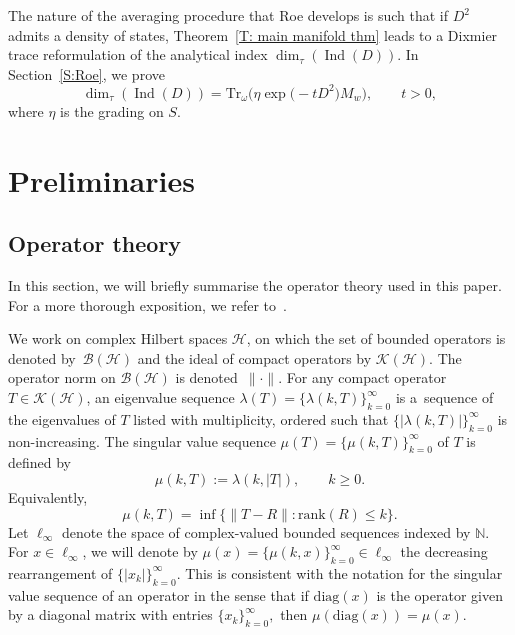\documentclass[pdftex]{sigma}
\numberwithin{equation}{section}
\begin{document}
The nature of the averaging procedure that Roe develops is such that if $D^2$ admits a density of states, Theorem~\ref{T: main manifold thm} leads to a Dixmier trace reformulation of the analytical index $\dim_\tau(\operatorname{Ind}(D))$. In Section~\ref{S:Roe}, we prove
\[
\dim_\tau(\operatorname{Ind}(D)) = \mathrm{Tr}_\omega\big(\eta \exp\bigl(-tD^2\bigr)M_w\big), \qquad t>0,
\]
where $\eta$ is the grading on $S$.

\section{Preliminaries}\label{S: Prelims}

\subsection{Operator theory}
In this section, we will briefly summarise the operator theory used in this paper. For a more thorough exposition, we refer to~\cite{LSZVol1, LMSZVol2}.

We work on complex Hilbert spaces $\mathcal{H}$, on which the set of bounded operators is denoted by~$\mathcal{B}(\mathcal{H})$ and the ideal of compact operators by $\mathcal{K}(\mathcal{H}).$ The operator norm on $\mathcal{B}(\mathcal{H})$ is denoted~$\|\cdot\|.$ For any compact operator $T \in \mathcal{K}(\mathcal{H})$, an eigenvalue sequence $\lambda(T) = \{\lambda(k,T)\}_{k=0}^\infty$ is a~sequence of the eigenvalues of $T$ listed with multiplicity, ordered such that $ \{|\lambda(k,T)|\}_{k=0}^\infty$ is non-increasing. The singular value sequence $\mu(T) = \{\mu(k,T)\}_{k=0}^\infty$ of $T$ is defined by
\[
\mu(k,T) :=\lambda(k,|T|), \qquad k \geq 0.
\]
Equivalently,
\[
\mu(k,T) = \inf\{\|T-R\|\colon \mathrm{rank}(R)\leq k\}.
\]
Let $\ell_\infty$ denote the space of complex-valued bounded sequences indexed by $\mathbb{N}.$ For $x\in \ell_\infty$, we will denote by $\mu(x) = \{\mu(k,x)\}_{k=0}^\infty \in \ell_\infty$ the decreasing rearrangement of $ \{|x_k|\}_{k=0}^\infty.$ This is consistent with the notation for the singular value sequence of an operator in the sense that if $\mathrm{diag}(x)$ is the operator given by a diagonal matrix with entries $\{x_k\}_{k=0}^\infty,$ then $\mu(\mathrm{diag}(x)) = \mu(x).$
\end{document}
